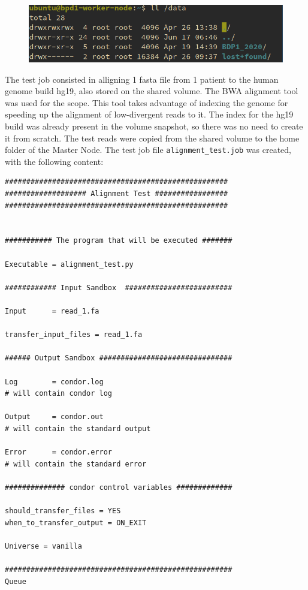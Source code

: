 \documentclass{article}
\begin{document}
\begin{figure}[!h]
	\center
	\includegraphics[width=.8\textwidth]{./images/nfs_bdp_works.png}
\end{figure}

The test job consisted in alligning 1 fasta file from 1 patient to the human genome build hg19, also stored on the shared volume.
The BWA alignment tool was used for the scope.
This tool takes advantage of indexing the genome for speeding up the alignment of low-divergent reads to it.
The index for the hg19 build was already present in the volume snapshot, so there was no need to create it from scratch.
The test reads were copied from the shared volume to the home folder of the Master Node.
The test job file \texttt{alignment\_test.job} was created, with the following content:

\begin{lstlisting}
####################################################
################### Alignment Test #################
####################################################


########### The program that will be executed #######

Executable = alignment_test.py

############ Input Sandbox  #########################

Input      = read_1.fa

transfer_input_files = read_1.fa

###### Output Sandbox ###############################

Log        = condor.log
# will contain condor log

Output     = condor.out
# will contain the standard output

Error      = condor.error
# will contain the standard error

############## condor control variables #############

should_transfer_files = YES
when_to_transfer_output = ON_EXIT

Universe = vanilla

#####################################################
Queue

\end{lstlisting}
\pagebreak
\end{document}
